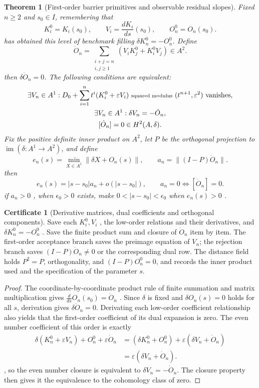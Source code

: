 \documentclass[12pt,a4paper,openany,notitlepage]{report}
\theoremstyle{plain}
\newtheorem{theorem}{Theorem}[chapter]
\theoremstyle{definition}
\newtheorem*{certificate}{Certificate}
\theoremstyle{remark}
\def\mathcal#1{#1}\def\mathsf#1{#1}\def\mathbb#1{#1}%
\begin{document}
\begin{CJK*}
\begin{theorem}
[First-order barrier primitives and observable residual slopes]\label{exp:hom:first-variation}
Fixed $n\ge2$ and $s_0\in I$, remembering that \[
 K_i^0=K_i(s_0),\qquad
 V_i=\frac{dK_i}{ds}(s_0),\qquad
 O_n^0=O_n(s_0).
\] has obtained this level of benchmark filling $\delta K_n^0=-O_n^0$. Define \[
 \dot O_n
 =\sum_{\substack{i+j=n\\i,j\ge1}}
       (V_iK_j^0+K_i^0V_j)\in\mathcal A^2.
\] then $\delta\dot O_n=0$. The following conditions are equivalent: \[
 \begin{gathered}
 \exists V_n\in\mathcal A^1:
 D_0+\sum_{i=1}^{n}t^i(K_i^0+\varepsilon V_i)
 \text{ \shortstack[c]{\scriptsize squared modulus} }(t^{n+1},\varepsilon^2)\text{ vanishes},\\
 \exists V_n\in\mathcal A^1:\delta V_n=-\dot O_n,\\
 [\dot O_n]=0\in H^2(\mathcal A,\delta).
 \end{gathered}
\] Fix the positive definite inner product on $\mathcal A^2$, let $P$ be the orthogonal projection to $\operatorname{im}(\delta:\mathcal A^1\to\mathcal A^2)$, and define \[
 e_n(s)=\min_{X\in\mathcal A^1}\|\delta X+O_n(s)\|,
 \qquad
 a_n=\|(I-P)\dot O_n\|.
\] then \[
 e_n(s)=|s-s_0|a_n+o(|s-s_0|),\qquad
 a_n=0\Longleftrightarrow[\dot O_n]=0.
\] if $a_n>0$ , when $\epsilon_0>0$ exists, make $0<|s-s_0|<\epsilon_0$ when $e_n(s)>0$ .\end{theorem}
\begin{certificate}
[Derivative matrices, dual coefficients and orthogonal components]Save each $K_i^0,V_i$ , the low-order relations and their derivatives, and $\delta K_n^0=-O_n^0$ . Save the finite product sum and closure of $\dot O_n$ item by item. The first-order acceptance branch saves the preimage equation of $V_n$; the rejection branch saves $(I-P)\dot O_n\ne0$ or the corresponding dual row. The distance field holds $P^2=P$, orthogonality, and $(I-P)O_n^0=0$, and records the inner product used and the specification of the parameter $s$.\end{certificate}
\begin{proof}
The coordinate-by-coordinate product rule of finite summation and matrix multiplication gives $\frac{d}{ds}O_n(s_0)=\dot O_n$ . Since $\delta$ is fixed and $\delta O_n(s)=0$ holds for all $s$, derivation gives $\delta\dot O_n=0$. Derivating each low-order coefficient relationship also yields that the first-order coefficient of its dual expansion is zero. The even number coefficient of this order is exactly \[
 \begin{aligned}
 \delta(K_n^0+\varepsilon V_n)
  +O_n^0+\varepsilon\dot O_n
 &=(\delta K_n^0+O_n^0)
   +\varepsilon(\delta V_n+\dot O_n)\\
 &=\varepsilon(\delta V_n+\dot O_n).
 \end{aligned}
\], so the even number closure is equivalent to $\delta V_n=-\dot O_n$. The closure property then gives it the equivalence to the cohomology class of zero.


\end{proof}
\end{CJK*}
\end{document}
